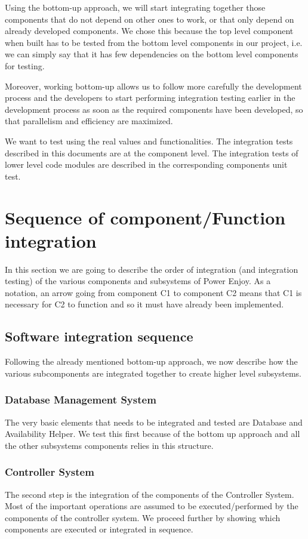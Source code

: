 Using the bottom-up approach, we will start integrating together those components that do not depend on other ones to work, or that only depend on already developed components. We chose this because the top level component when built has to be tested from the bottom level components in our project, i.e. we can simply say that it has few dependencies on the bottom level components for testing.

Moreover, working bottom-up allows us to follow more carefully the development process and the developers to start performing integration testing earlier in the development process as soon as the required components have been developed, so that parallelism and efficiency are maximized.

We want to test using the real values and functionalities. The integration tests described in this documents are at the component level. The integration tests of lower level code modules are described in the corresponding components unit test.

\section{Sequence of component/Function integration}
In this section we are going to describe the order of integration (and integration testing) of the various components and subsystems of Power Enjoy.
As a notation, an arrow going from component C1 to component C2 means that C1 is necessary for C2 to function and so it must have already been
implemented.

\subsection{Software integration sequence}
Following the already mentioned bottom-up approach, we now describe how
the various subcomponents are integrated together to create higher level
subsystems.

\subsubsection*{Database Management System}
The very basic elements that needs to be integrated and tested are Database and Availability Helper. We test this first because of the bottom up approach and
all the other subsystems components relies in this structure.

\subsubsection*{Controller System}
The second step is the integration of the components of the Controller System. Most of the important operations are assumed to be executed/performed
by the components of the controller system. We proceed further by showing which components are executed or integrated in sequence.

